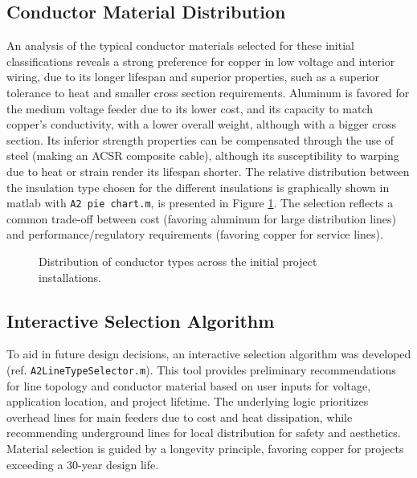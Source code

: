 \documentclass[12pt, a4paper]{article}
\begin{document}
\subsection{Conductor Material Distribution}
An analysis of the typical conductor materials selected for these initial classifications reveals a strong preference for copper in low voltage and interior wiring, due to its longer lifespan and superior properties, such as a superior tolerance to heat and smaller cross section requirements. Aluminum is favored for the medium voltage feeder due to its lower cost, and its capacity to match copper's conductivity, with a lower overall weight, although with a bigger cross section. Its inferior strength properties can be compensated through the use of steel (making an ACSR composite cable), although its susceptibility to warping due to heat or strain render its lifespan shorter. The relative distribution between the insulation type chosen for the different insulations is graphically shown in matlab with \texttt{A2 pie chart.m}, is presented in Figure \ref{fig:conductor_pie}. The selection reflects a common trade-off between cost (favoring aluminum for large distribution lines) and performance/regulatory requirements (favoring copper for service lines).

\begin{figure}[h!]
    \centering
    \caption{Distribution of conductor types across the initial project installations.}
    \label{fig:conductor_pie}
\end{figure}
    
\subsection{Interactive Selection Algorithm}
To aid in future design decisions, an interactive selection algorithm was developed (ref. \texttt{A2LineTypeSelector.m}). This tool provides preliminary recommendations for line topology and conductor material based on user inputs for voltage, application location, and project lifetime. The underlying logic prioritizes overhead lines for main feeders due to cost and heat dissipation, while recommending underground lines for local distribution for safety and aesthetics. Material selection is guided by a longevity principle, favoring copper for projects exceeding a 30-year design life.
\end{document}
